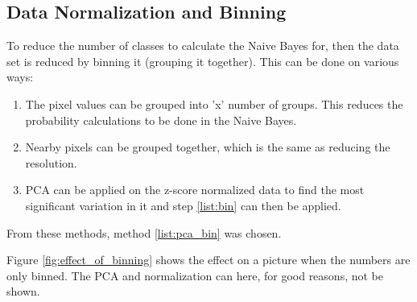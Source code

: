 \subsection{Data Normalization and Binning}

To reduce the number of classes to calculate the Naive Bayes for, then the data set is reduced by binning it (grouping it together).
This can be done on various ways:

\begin{enumerate}
\item The pixel values can be grouped into 'x' number of groups.
This reduces the probability calculations to be done in the Naive Bayes. \label{list:bin}
\item Nearby pixels can be grouped together, which is the same as reducing the resolution.
\item PCA can be applied on the z-score normalized data to find the most significant variation in it and step \ref{list:bin} can then be applied. \label{list:pca_bin}
\end{enumerate}

From these methods, method \ref{list:pca_bin} was chosen.

Figure \ref{fig:effect_of_binning} shows the effect on a picture when the numbers are only binned.
The PCA and normalization can here, for good reasons, not be shown.


